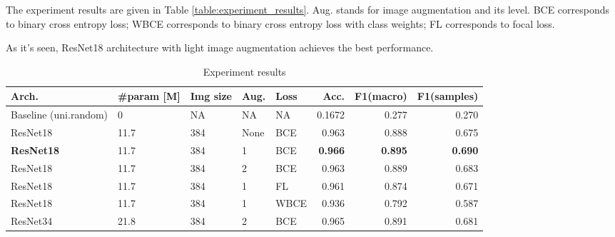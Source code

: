 \documentclass[conference]{IEEEtran}
\begin{document}
The experiment results are given in Table \ref{table:experiment_results}. 
Aug. stands for image augmentation and its level. 
BCE corresponds to binary cross entropy loss; WBCE corresponds to binary cross entropy loss with 
class weights; FL corresponds to focal loss.

As it's seen, ResNet18 architecture with light image augmentation achieves the best performance.

\begin{table}[bp]
\caption{Experiment results}
\begin{center}
\begin{tabular}{lllll|rrr}
\textbf{Arch.} & \textbf{\#param [M]} & \multicolumn{1}{l}{\textbf{Img size}} & \textbf{Aug.} & \textbf{Loss} & \multicolumn{1}{r}{\textbf{Acc.}} & \multicolumn{1}{r}{\textbf{F1(macro)}} & \multicolumn{1}{r}{\textbf{F1(samples)}} \\ \hline
Baseline (uni.random) & 0        & NA & NA                    & NA     & 0.1672                                & 0.277                                  & 0.270                                   \\ 
ResNet18              & 11.7     & 384 & None                 & BCE    & 0.963                                 & 0.888                                  & 0.675                                   \\ 
\textbf{ResNet18}     & 11.7     & 384 & 1                    & BCE    & \textbf{0.966}                        & \textbf{0.895}                         & \textbf{0.690}                                   \\ 
ResNet18              & 11.7     & 384 & 2                    & BCE    & 0.963                                 & 0.889                                  & 0.683                                   \\ 
ResNet18              & 11.7     & 384 & 1                    & FL     & 0.961                                 & 0.874                                  & 0.671                                   \\ 
ResNet18              & 11.7     & 384 & 1                    & WBCE   & 0.936                                 & 0.792                                  & 0.587                                   \\ 
ResNet34              & 21.8     & 384 & 2                    & BCE    & 0.965                                 & 0.891                                  & 0.681                                   \\ 

\end{tabular}
\end{center}
\end{table}
\end{document}
